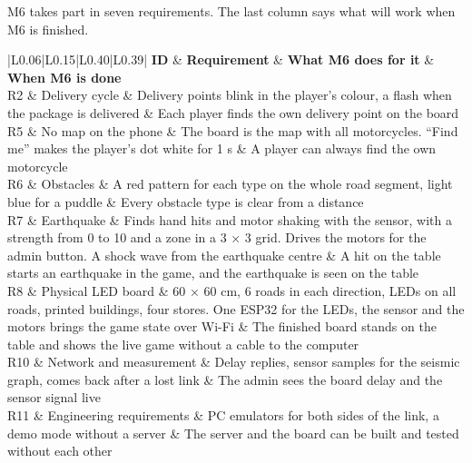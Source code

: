 \documentclass[
  english,
  10pt,
  a4paper,
]{article}
\newcommand{\ckkeep}[1]{\par\noindent\begin{minipage}{\linewidth}\setlength{\parskip}{4pt}#1\end{minipage}\par\smallskip}
\begin{document}
\ckkeep{%
M6 takes part in seven requirements. The last column says what will work when M6 is finished.

\begin{tabular}{|L{0.06}|L{0.15}|L{0.40}|L{0.39}|}
\hline \textbf{ID} & \textbf{Requirement} & \textbf{What M6 does for it} & \textbf{When M6 is done} \\ \hline 
R2 & Delivery cycle & Delivery points blink in the player's colour, a flash when the package is delivered & Each player finds the own delivery point on the board \\ \hline
R5 & No map on the phone & The board is the map with all motorcycles. ``Find me'' makes the player's dot white for 1 s & A player can always find the own motorcycle \\ \hline
R6 & Obstacles & A red pattern for each type on the whole road segment, light blue for a puddle & Every obstacle type is clear from a distance \\ \hline
R7 & Earthquake & Finds hand hits and motor shaking with the sensor, with a strength from 0 to 10 and a zone in a 3 × 3 grid. Drives the motors for the admin button. A shock wave from the earthquake centre & A hit on the table starts an earthquake in the game, and the earthquake is seen on the table \\ \hline
R8 & Physical LED board & 60 × 60 cm, 6 roads in each direction, LEDs on all roads, printed buildings, four stores. One ESP32 for the LEDs, the sensor and the motors brings the game state over Wi-Fi & The finished board stands on the table and shows the live game without a cable to the computer \\ \hline
R10 & Network and measurement & Delay replies, sensor samples for the seismic graph, comes back after a lost link & The admin sees the board delay and the sensor signal live \\ \hline
R11 & Engineering requirements & PC emulators for both sides of the link, a demo mode without a server & The server and the board can be built and tested without each other \\ \hline
\end{tabular}}

\end{document}
